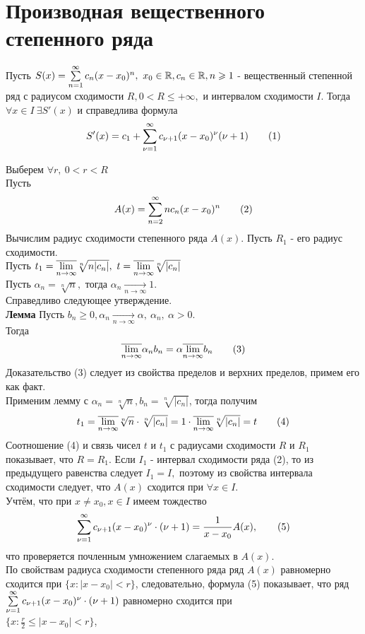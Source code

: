\documentclass[main]{subfiles}
\begin{document}
\section{Производная вещественного степенного ряда}
\begin{theorem}
     Пусть $S(x)=\su c_n(x-x_0)^n,\ x_0\in\R, c_n\in\R, n\geq 1$ - вещественный степенной ряд с радиусом сходимости $R,
      0<R\leq+\infty,$ и интервалом сходимости $I$. Тогда $\forall x\in I\ \exists S'(x)$ и справедлива формула
       \[ S'(x)=c_1+\su[\nu=1] c_{\nu+1}(x-x_0)^\nu (\nu+1)\tag{1} \]
\end{theorem}
\begin{longProof}
     Выберем $\forall r,\ 0<r<R$\\
Пусть \[ A(x)=\su[n=2] nc_n(x-x_0)^n\tag{2} \]
Вычислим радиус сходимости степенного ряда $A(x).$ Пусть $R_1$ - его радиус сходимости.\\
Пусть $t_1=\overline{\Lim}\sqrt[n]{n|c_n|},\ t=\overline{\Lim}\sqrt[n]{|c_n|}$\\
Пусть $\alpha_n=\sqrt[n]{n},$ тогда $\alpha_n\underset{n\to\infty}{\rightarrow} 1.$\\ Справедливо следующее утверждение.\\
\textbf{Лемма} Пусть $b_n\geq 0, \alpha_n\underset{n\to\infty}{\rightarrow}\alpha,\ \alpha_n,\ \alpha>0.$\\
Тогда \[ \overline{\Lim} \alpha_n b_n=\alpha\overline{\Lim} b_n\tag{3}\]
Доказательство (3) следует из свойства пределов и верхних пределов, примем его как факт.\\
Применим лемму с $\alpha_n=\sqrt[n]{n}, b_n=\sqrt[n]{|c_n|}$, тогда получим 
\[ t_1=\overline{\Lim} \sqrt[n]{n}\cdot\sqrt[n]{|c_n|}=1\cdot\overline{\Lim}\sqrt[n]{|c_n|}=t\tag{4} \]
Соотношение (4) и связь чисел $t$ и $t_1$ с радиусами сходимости $R$ и $R_1$ показывает, что $R=R_1.$
 Если $I_1$ - интервал сходимости ряда (2), то из предыдущего равенства следует $I_1=I,$ поэтому из свойства интервала сходимости следует,
  что $A(x)$ сходится при $\forall x\in I.$\\ Учтём, что при $x\ne x_0, x\in I$ имеем тождество 
  \[ \su[\nu=1] c_{\nu+1}(x-x_0)^{\nu}\cdot(\nu+1)=\frac{1}{x-x_0}A(x),\tag{5} \]
что проверяется почленным умножением слагаемых в $A(x).$\\ По свойствам радиуса сходимости степенного ряда ряд $A(x)$ равномерно
 сходится при $\{ x:|x-x_0|< r\}$, следовательно, формула (5) показывает, что ряд $\su[\nu=1]
  c_{\nu+1}(x-x_0)^{\nu}\cdot(\nu+1)$ равномерно сходится при\\ $\{ x: \frac{r}{2}\leq|x-x_0|< r\}$,

\end{longProof}
\end{document}
